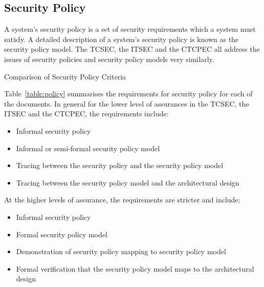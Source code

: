     \subsection{Security Policy} 
    A system's security policy is a set of security requirements which 
    a system must satisfy. A detailed description of a system's security 
    policy is known as the security policy model. The TCSEC, the ITSEC and the CTCPEC 
    all address the issues of security policies and security policy models very similarly.
    \begin{table}[H]
    \begin{center}
    \bc
    \ec
    \end{center}
    \caption{Comparison of Security Policy Criteria} \label{table:policy}
    \end{table}
    Table~\ref{table:policy} summarises the requirements for security policy for each of the documents.
    In general for the lower level of assurances in the TCSEC, the ITSEC and the CTCPEC, the
    requirements include:
    \begin{itemize}
        \item Informal security policy
        \item Informal or semi-formal security policy model
        \item Tracing between the security policy and the security policy model
        \item Tracing between the security policy model and the architectural design
    \end{itemize}
    At the higher levels of assurance, the requirements are stricter and include:
    \begin{itemize}
        \item Informal security policy
        \item Formal security policy model
        \item Demonstration of security policy mapping to security policy model
        \item Formal verification that the security policy model maps to the architectural design
    \end{itemize}

